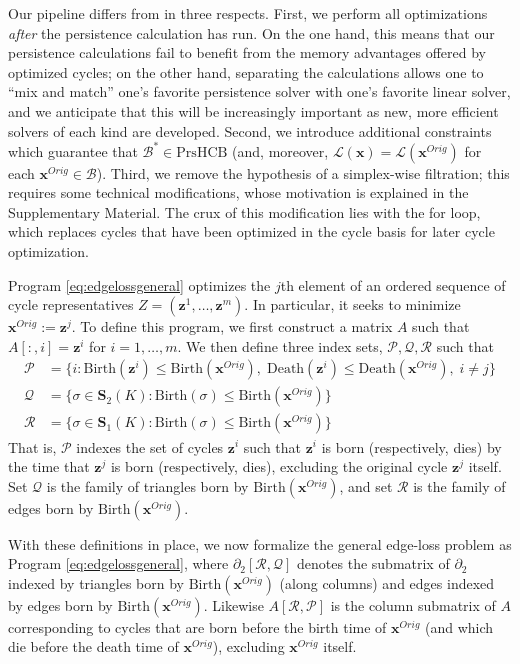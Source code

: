 \documentclass[utf8]{formatting_stuff/frontiersFPHY}
\newcommand{\Simplices}[0]{\mathbf{S}}
\newcommand{\originalrep}{\mathbf{x}^{Orig}}
\newcommand{\optimalrep}{\mathbf{x}}
\newcommand{\cycle}{{\mathbf z}}
\newcommand{\birth}{\mathrm{Birth}}
\newcommand{\death}{\mathrm{Death}}
\newcommand{\persinterval}{\mathcal{L}}
\newcommand{\setofpersistenthcyclebases}{\mathrm{PrsHCB}}
\newcommand{\hcyclebasis}{\mathcal B}
\newcommand{\goodcycleindices}{\mathcal P}
\newcommand{\goodtriangles}{\mathcal Q}
\newcommand{\goodedges}{\mathcal R}
\newcommand{\obasis}{Z} %
\newcommand{\obasisel}{\mathbf{z}}  %
\theoremstyle{plain}
\theoremstyle{definition}
\begin{document}
Our pipeline differs from \cite{Escolar2016} in three respects.  First, we perform all optimizations \emph{after} the persistence calculation has run.   On the one hand, this means that our persistence calculations  fail to  benefit from the memory advantages offered by optimized cycles; on the other hand, separating the calculations allows one to ``mix and match'' one's favorite persistence solver with one's favorite linear solver, and we anticipate that this will be increasingly important as new, more efficient solvers of each kind are developed.  Second, we introduce additional constraints which guarantee that $\hcyclebasis^* \in \setofpersistenthcyclebases$  
(and, moreover, $\persinterval( \optimalrep) = \persinterval( \originalrep)$ for each $\originalrep \in \hcyclebasis$). Third, we remove the hypothesis of a simplex-wise filtration; this requires some technical modifications, whose motivation is explained in the Supplementary Material. The crux of this modification lies with the for loop, which replaces cycles that have been optimized in the cycle basis for later cycle optimization.

Program \eqref{eq:edgelossgeneral} optimizes the $j$th element of an ordered sequence of cycle representatives $\obasis = (\obasisel^1, \ldots, \obasisel^m)$.  In particular, it seeks to minimize $\originalrep := \cycle^j$.  To define this program, we first construct a matrix $A$ such that $A[:, i] = \cycle^i$ for $i = 1, \ldots, m$.  We then define  three index sets, $\goodcycleindices, \goodtriangles, \goodedges$ such that 
    \begin{align*}
        \goodcycleindices &= \{ i :  \birth(\cycle^i) \le \birth(\originalrep), \;  \death(\cycle^i) \le \death(\originalrep), \; i \neq j \} \\
        \goodtriangles &= \{\sigma \in \Simplices_2(K) : \birth(\sigma) \le \birth(\originalrep)\} 
        \\
        \goodedges &= \{\sigma \in \Simplices_1(K) : \birth(\sigma) \le \birth(\originalrep)\}
    \end{align*} 
That is, $\goodcycleindices$ indexes the set of cycles $\cycle^i$ such that $\cycle^i$ is born  (respectively, dies) by the time that $\cycle^j$ is born (respectively, dies),  excluding the original cycle $\cycle^j$ itself. Set $\goodtriangles$ is the family of triangles born by $\birth(\originalrep)$, and set $\goodedges$ is the family of edges born by $\birth(\originalrep)$. 

With these definitions in place, we now formalize the general edge-loss problem as Program \eqref{eq:edgelossgeneral}, where  $\partial_2[\goodedges,\goodtriangles]$ denotes the  submatrix of $\partial_2$ indexed by triangles born by $\birth(\originalrep)$ (along columns) and edges indexed by edges born by $\birth(\originalrep)$.  Likewise $A[ \goodedges ,\goodcycleindices]$ is the column submatrix of $A$ corresponding to cycles that are born  before the birth time of $\originalrep$ (and which die before the death time of $\originalrep$), excluding $\originalrep$ itself.
\end{document}
